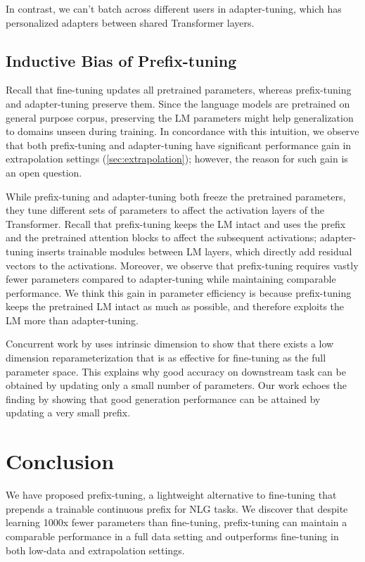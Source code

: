 In contrast, we can't batch across different users in adapter-tuning, which has personalized adapters between shared Transformer layers.   

\subsection{Inductive Bias of Prefix-tuning} Recall that fine-tuning updates all pretrained parameters, whereas prefix-tuning and adapter-tuning preserve them. Since the language models are pretrained on general purpose corpus, preserving the LM parameters might help generalization to domains unseen during training. In concordance with this intuition, we observe that both prefix-tuning and adapter-tuning have significant performance gain in extrapolation settings (\ref{sec:extrapolation}); however, the reason for such gain is an open question. 

While prefix-tuning and adapter-tuning both freeze the pretrained parameters, they tune different sets of parameters to affect the activation layers of the Transformer. Recall that prefix-tuning keeps the LM intact and uses the prefix and the pretrained attention blocks to affect the subsequent activations; adapter-tuning inserts trainable modules between LM layers, which directly add residual vectors to the activations. Moreover, we observe that prefix-tuning requires vastly fewer parameters compared to adapter-tuning while maintaining comparable performance. We think this gain in parameter efficiency is because prefix-tuning keeps the pretrained LM intact as much as possible, and therefore exploits the LM more than adapter-tuning.  

Concurrent work by \citet{aghajanyan2020intrinsic} uses intrinsic dimension to show that there exists a low dimension reparameterization that is as effective for fine-tuning as the full parameter space. This explains why good accuracy on downstream task can be obtained by updating only a small number of parameters. Our work echoes the finding by showing that good generation performance can be attained by updating a very small prefix.

\section{Conclusion}

We have proposed prefix-tuning, a lightweight alternative to fine-tuning that prepends a trainable continuous prefix for NLG tasks. We discover that despite learning 1000x fewer parameters than fine-tuning, prefix-tuning can maintain a comparable performance in a full data setting and outperforms fine-tuning in both low-data and extrapolation settings.


